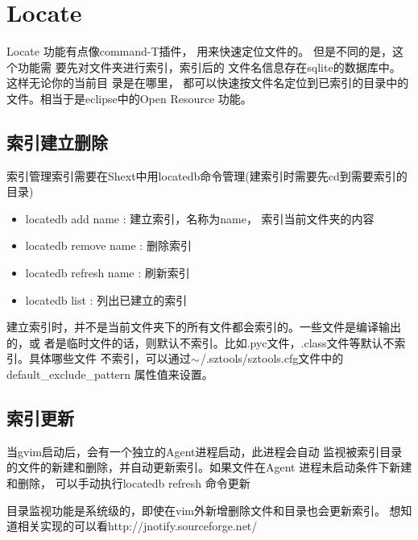 \documentclass[oneside,openany]{book}
\begin{document}
\section{Locate}

    Locate 功能有点像command-T插件， 用来快速定位文件的。 但是不同的是，这个功能需
要先对文件夹进行索引，索引后的 文件名信息存在sqlite的数据库中。 这样无论你的当前目
录是在哪里， 都可以快速按文件名定位到已索引的目录中的文件。相当于是eclipse中的Open Resource
功能。

\subsection{索引建立删除}
  索引管理索引需要在Shext中用locatedb命令管理(建索引时需要先cd到需要索引的目录) 
  \begin{itemize}
      \item locatedb add name : 建立索引，名称为name， 索引当前文件夹的内容
      \item locatedb remove name : 删除索引
      \item locatedb refresh name : 刷新索引
      \item locatedb list : 列出已建立的索引 
  \end{itemize}

  建立索引时，并不是当前文件夹下的所有文件都会索引的。一些文件是编译输出的，或
者是临时文件的话，则默认不索引。比如.pyc文件，.class文件等默认不索引。具体哪些文件
不索引，可以通过$\tiny{\sim}$/.sztools/sztools.cfg文件中的default\_exclude\_pattern
属性值来设置。

\subsection{索引更新}
    当gvim启动后，会有一个独立的Agent进程启动，此进程会自动
监视被索引目录的文件的新建和删除，并自动更新索引。如果文件在Agent
进程未启动条件下新建和删除， 可以手动执行locatedb refresh 命令更新

   目录监视功能是系统级的，即使在vim外新增删除文件和目录也会更新索引。
想知道相关实现的可以看http://jnotify.sourceforge.net/
\end{document}
